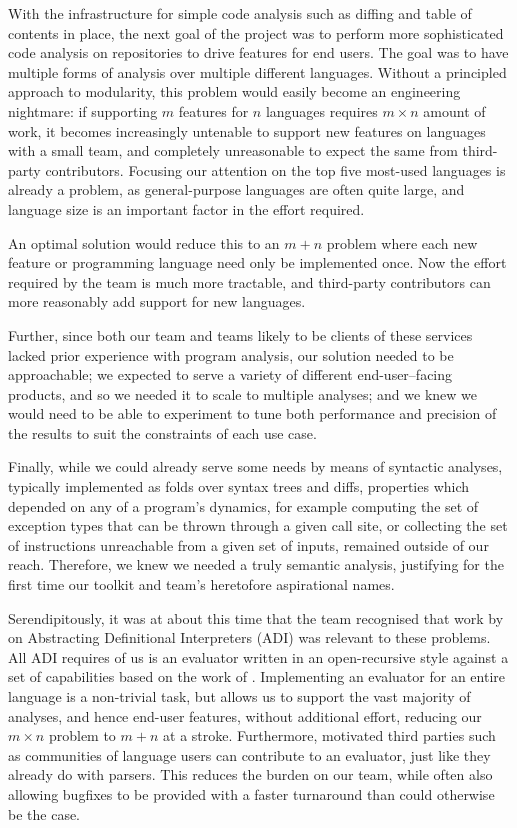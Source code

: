 \documentclass[acmsmall,fleqn,12pt]{acmart}
\begin{document}
With the infrastructure for simple code analysis such as diffing and table of
contents in place, the next goal of the project was to perform more
sophisticated code analysis on repositories to drive features for end users. The
goal was to have multiple forms of analysis over multiple different languages.
Without a principled approach to modularity, this problem would easily become an
engineering nightmare: if supporting $m$ features for $n$ languages requires $m
\times n$ amount of work, it becomes increasingly untenable to support new
features on languages with a small team, and completely unreasonable to expect
the same from third-party contributors. Focusing our attention on the top five
most-used languages is already a problem, as general-purpose languages are often
quite large, and language size is an important factor in the effort required.

An optimal solution would reduce this to an $m + n$ problem where each new feature
or programming language need only be implemented once. Now the effort required
by the team is much more tractable, and third-party contributors can more
reasonably add support for new languages.

Further, since both our team and teams likely to be clients of these services
lacked prior experience with program analysis, our solution needed to be approachable;
we expected to serve a variety of different end-user–facing products, and so we
needed it to scale to multiple analyses; and we knew we would need to be able to
experiment to tune both performance and precision of the results to suit the
constraints of each use case.

Finally, while we could already serve some needs by means of syntactic analyses,
typically implemented as folds over syntax trees and diffs, properties which
depended on any of a program's dynamics, for example computing the set of
exception types that can be thrown through a given call site, or collecting the
set of instructions unreachable from a given set of inputs, remained outside of our
reach. Therefore, we knew we needed a truly semantic analysis, justifying for the
first time our toolkit and team's heretofore aspirational names.

Serendipitously, it was at about this time that the team recognised that work by
\citet{Darais17Abstracting} on Abstracting Definitional Interpreters (ADI) was
relevant to these problems. All ADI requires of us is an evaluator written in an
open-recursive style against a set of capabilities based on the work of
\citet{Horn10Abstracting}. Implementing an evaluator for an entire language is a
non-trivial task, but allows us to support the vast majority of analyses, and
hence end-user features, without additional effort, reducing our $m \times n$
problem to $m + n$ at a stroke. Furthermore, motivated third parties such as
communities of language users can contribute to an evaluator, just like they
already do with parsers. This reduces the burden on our team, while often also
allowing bugfixes to be provided with a faster turnaround than could
otherwise be the case.
\end{document}
